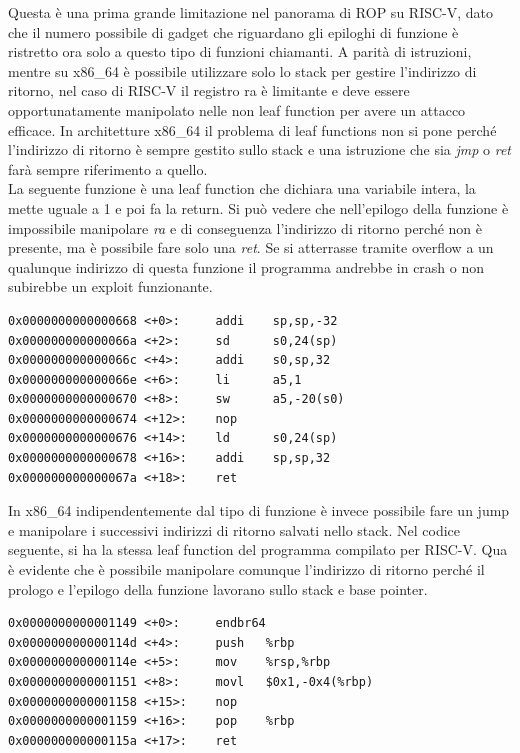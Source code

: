 \FloatBarrier
\vspace{1cm}
Questa è una prima grande limitazione nel panorama di ROP su RISC-V, dato che il numero possibile di gadget che riguardano gli epiloghi di funzione è ristretto ora solo a questo tipo di funzioni chiamanti. A parità di istruzioni, mentre su x86\_64 è possibile utilizzare solo lo stack per gestire l'indirizzo di ritorno, nel caso di RISC-V il registro ra è limitante e deve essere opportunatamente manipolato nelle non leaf function per avere un attacco efficace. In architetture x86\_64 il problema di leaf functions non si pone perché l'indirizzo di ritorno è sempre gestito sullo stack e una istruzione che sia \textit{jmp} o \textit{ret} farà sempre riferimento a quello.\\
La seguente funzione è una leaf function che dichiara una variabile intera, la mette uguale a 1 e poi fa la return. Si può vedere che nell'epilogo della funzione è impossibile manipolare \textit{ra} e di conseguenza l'indirizzo di ritorno perché non è presente, ma è possibile fare solo una \textit{ret}. Se si atterrasse tramite overflow a un qualunque indirizzo di questa funzione il programma andrebbe in crash o non subirebbe un exploit funzionante.\\
\begin{verbatim}
0x0000000000000668 <+0>:     addi    sp,sp,-32
0x000000000000066a <+2>:     sd      s0,24(sp)
0x000000000000066c <+4>:     addi    s0,sp,32
0x000000000000066e <+6>:     li      a5,1
0x0000000000000670 <+8>:     sw      a5,-20(s0)
0x0000000000000674 <+12>:    nop
0x0000000000000676 <+14>:    ld      s0,24(sp)
0x0000000000000678 <+16>:    addi    sp,sp,32
0x000000000000067a <+18>:    ret
\end{verbatim} 
In x86\_64 indipendentemente dal tipo di funzione è invece possibile fare un jump e manipolare i successivi indirizzi di ritorno salvati nello stack. Nel codice seguente, si ha la stessa leaf function del programma compilato per RISC-V. Qua è evidente che è possibile manipolare comunque l'indirizzo di ritorno perché il prologo e l'epilogo della funzione lavorano sullo stack e base pointer.
\begin{verbatim}
0x0000000000001149 <+0>:     endbr64
0x000000000000114d <+4>:     push   %rbp
0x000000000000114e <+5>:     mov    %rsp,%rbp
0x0000000000001151 <+8>:     movl   $0x1,-0x4(%rbp)
0x0000000000001158 <+15>:    nop
0x0000000000001159 <+16>:    pop    %rbp
0x000000000000115a <+17>:    ret
\end{verbatim} 

